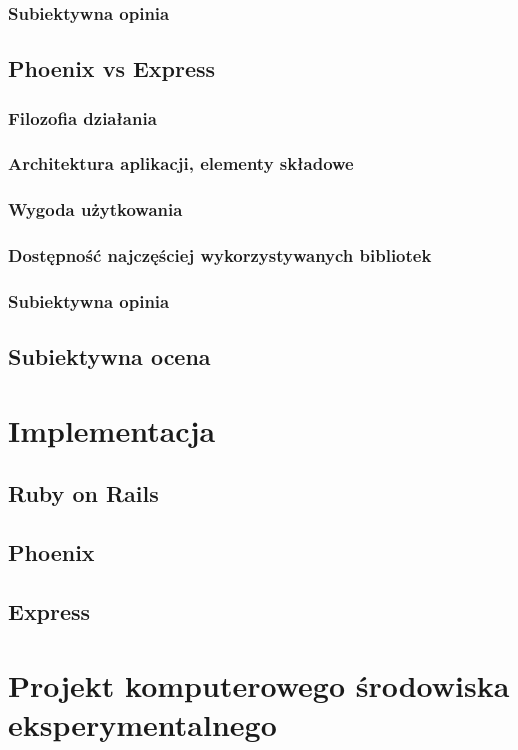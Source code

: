 \documentclass[mgr,oneside]{mgr}
\begin{document}
\subsection{Subiektywna opinia}

\section{Phoenix vs Express}
\subsection{Filozofia działania}
\subsection{Architektura aplikacji, elementy składowe}
\subsection{Wygoda użytkowania}
\subsection{Dostępność najczęściej wykorzystywanych bibliotek}
\subsection{Subiektywna opinia}

\section{Subiektywna ocena}

\chapter{Implementacja}
\section{Ruby on Rails}
\section{Phoenix}
\section{Express}

\chapter{Projekt komputerowego środowiska eksperymentalnego}
\end{document}
